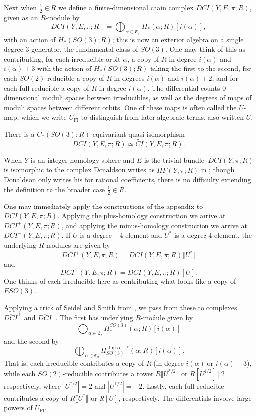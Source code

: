 \documentclass{memo-l}
\theoremstyle{definition}
\theoremstyle{remark}
\numberwithin{section}{chapter}
\numberwithin{equation}{chapter}
\begin{document}
Next when $\frac 12 \in R$ we define a finite-dimensional chain complex $DCI(Y,E,\pi;R)$, given as an $R$-module by $$DCI(Y,E,\pi;R) = \bigoplus_{\alpha \in \mathfrak C_\pi} H_*(\alpha;R)[i(\alpha)],$$ with an action of $H_*(SO(3);R)$; this is now an exterior algebra on a single degree-3 generator, the fundamental class of $SO(3)$. One may think of this as contributing, for each irreducible orbit $\alpha$, a copy of $R$ in degree $i(\alpha)$ and $i(\alpha)+3$ with the action of $H_*(SO(3);R)$ taking the first to the second, for each $SO(2)$-reducible a copy of $R$ in degrees $i(\alpha)$ and $i(\alpha)+2$, and for each full reducible a copy of $R$ in degree $i(\alpha)$. The differential counts $0$-dimensional moduli spaces between irreducibles, as well as the degrees of maps of moduli spaces between different orbits. One of these maps is often called the $U$-map, which we write $U_{\text{Fl}}$ to distinguish from later algebraic terms, also written $U$.

There is a $C_*(SO(3);R)$-equivariant quasi-isomorphism $$DCI(Y,E,\pi;R) \simeq \widetilde{CI}(Y,E,\pi;R).$$ 

When $Y$ is an integer homology sphere and $E$ is the trivial bundle, $DCI(Y,\pi;R)$ is isomorphic to the complex Donaldson writes as $\widetilde{HF}(Y,\pi;R)$ in \cite[Chapter~7.3.3]{Don}; though Donaldson only writes his for rational coefficients, there is no difficulty extending the definition to the broader case $\frac 12 \in R$.

One may immediately apply the constructions of the appendix to $DCI(Y,E,\pi;R)$. Applying the plus-homology construction we arrive at $DCI^+(Y,E,\pi;R)$, and applying the minus-homology construction we arrive at $DCI^-(Y,E,\pi;R)$. If $U$ is a degree $-4$ element and $U^*$ is a degree $4$ element, the underlying $R$-modules are given by $$DCI^+(Y,E,\pi;R) = DCI(Y,E,\pi;R)\llbracket U^*\rrbracket$$ and $$DCI^-(Y,E,\pi;R) = DCI(Y,E,\pi;R)[U].$$ One thinks of each irreducible here as contributing what looks like a copy of $ESO(3)$. 

Applying a trick of Seidel and Smith from \cite{SS-Invol}, we pass from these to complexes $\overline{DCI}^+$ and $\overline{DCI}^-$. The first has underlying $R$-module given by $$\bigoplus_{\alpha \in \mathfrak C_\pi} H^{SO(3)}_*(\alpha; R)[i(\alpha)]$$ and the second by $$\bigoplus_{\alpha \in \mathfrak C_\pi} H_{SO(3)}^{\dim \alpha-*}(\alpha; R)[i(\alpha)].$$ That is, each irreducible contributes a copy of $R$ (in degree $i(\alpha)$ or $i(\alpha)+3$), while each $SO(2)$-reducible contributes a tower $R\llbracket U^{*/2}\rrbracket$ or $R[U^{1/2}][2]$ respectively, where $|U^{*/2}| = 2$ and $|U^{1/2}| = -2$. Lastly, each full reducible contributes a copy of $R\llbracket U^*\rrbracket$ or $R[U]$, respectively. The differentials involve large powers of $U_{\text{Fl}}$.
\end{document}
